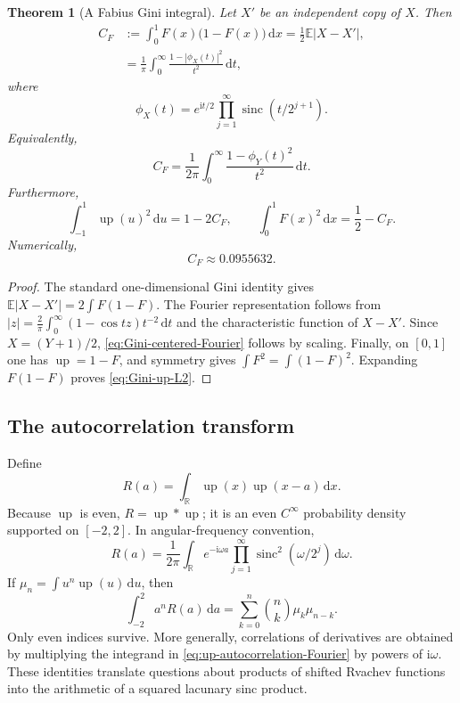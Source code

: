 \documentclass[11pt,oneside]{article}
\newtheorem{theorem}{Theorem}[section]
\theoremstyle{definition}
\theoremstyle{remark}
\newcommand{\R}{\mathbb R}
\newcommand{\E}{\mathbb E}
\newcommand{\ii}{\mathrm i}
\newcommand{\dd}{\,\mathrm d}
\newcommand{\upf}{\operatorname{up}}
\newcommand{\sinc}{\operatorname{sinc}}
\begin{document}
\begin{theorem}[A Fabius Gini integral]\label{thm:Fabius-Gini}
Let $X'$ be an independent copy of $X$.  Then
\begin{align}
 C_F&:=\int_0^1F(x)\bigl(1-F(x)\bigr)\dd x
 =\frac12\E|X-X'|,\label{eq:Gini-probability}\\
 &=\frac1\pi\int_0^\infty
 \frac{1-|\phi_X(t)|^2}{t^2}\dd t,\label{eq:Gini-Fourier}
\end{align}
where
\begin{equation}\label{eq:phi-X}
 \phi_X(t)=e^{\ii t/2}
 \prod_{j=1}^{\infty}\sinc(t/2^{j+1}).
\end{equation}
Equivalently,
\begin{equation}\label{eq:Gini-centered-Fourier}
 C_F=\frac1{2\pi}\int_0^\infty
 \frac{1-\phi_Y(t)^2}{t^2}\dd t.
\end{equation}
Furthermore,
\begin{equation}\label{eq:Gini-up-L2}
 \int_{-1}^{1}\upf(u)^2\dd u=1-2C_F,
 \qquad
 \int_0^1F(x)^2\dd x=\frac12-C_F.
\end{equation}
Numerically,
\begin{equation}\label{eq:Gini-numerical}
 C_F\approx0.0955632.
\end{equation}
\end{theorem}

\begin{proof}
The standard one-dimensional Gini identity gives
$\E|X-X'|=2\int F(1-F)$.  The Fourier representation follows from
$|z|=\frac2\pi\int_0^\infty(1-\cos tz)t^{-2}\dd t$
and the characteristic function of $X-X'$.  Since $X=(Y+1)/2$, \eqref{eq:Gini-centered-Fourier} follows by scaling.  Finally, on $[0,1]$ one has $\upf=1-F$, and symmetry gives
$\int F^2=\int(1-F)^2$.  Expanding $F(1-F)$ proves \eqref{eq:Gini-up-L2}.
\end{proof}

\subsection{The autocorrelation transform}

Define
\begin{equation}\label{eq:up-autocorrelation}
 R(a)=\int_{\R}\upf(x)\upf(x-a)\dd x.
\end{equation}
Because $\upf$ is even, $R=\upf*\upf$; it is an even $C^\infty$ probability density supported on $[-2,2]$.  In angular-frequency convention,
\begin{equation}\label{eq:up-autocorrelation-Fourier}
 R(a)=\frac1{2\pi}\int_{\R}e^{-\ii\omega a}
 \prod_{j=1}^{\infty}\sinc^2(\omega/2^j)\dd\omega.
\end{equation}
If $\mu_n=\int u^n\upf(u)\dd u$, then
\begin{equation}\label{eq:autocorrelation-moments}
 \int_{-2}^{2}a^nR(a)\dd a
 =\sum_{k=0}^n\binom nk\mu_k\mu_{n-k}.
\end{equation}
Only even indices survive.  More generally, correlations of derivatives are obtained by multiplying the integrand in \eqref{eq:up-autocorrelation-Fourier} by powers of $\ii\omega$.  These identities translate questions about products of shifted Rvachev functions into the arithmetic of a squared lacunary sinc product.
\end{document}
